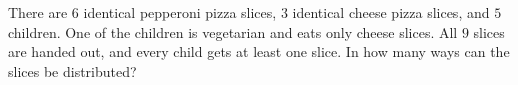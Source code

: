 There are $6$ identical pepperoni pizza slices, $3$ identical cheese pizza slices, and $5$ children. One of the children is vegetarian and eats only cheese slices. All $9$ slices are handed out, and every child gets at least one slice. In how many ways can the slices be distributed?
